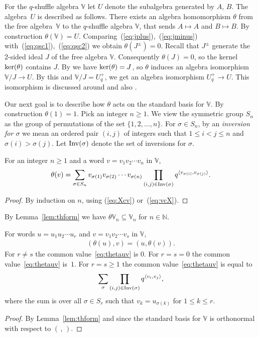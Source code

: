 For the $q$-shuffle algebra $\mathbb V$ let $U$ denote the
subalgebra generated by $A$, $B$. The algebra~$U$ is described as follows.
There exists an algebra homomorphism $\theta$ from
the free algebra~$\mathbb V$ to the $q$-shuffle algebra $\mathbb V$, that sends
$A\mapsto A$ and $B\mapsto B$. By construction $\theta(\mathbb V)=U$.
Comparing~(\ref{eq:jplus}),~(\ref{eq:jminus}) with~(\ref{eq:qsc1}),~(\ref{eq:qsc2})
 we obtain $\theta(J^\pm)=0$.
Recall that $J^\pm$ generate the 2-sided ideal $J$ of
the free algebra $\mathbb V$. Consequently $\theta (J)=0$,
so the kernel ${\rm ker}(\theta)$ contains $J$.
 By
\cite[Theorem~15]{rosso} we have
 ${\rm ker}(\theta)=J$,
so $\theta$ induces an algebra isomorphism $\mathbb V/J\to U$.
By this and $\mathbb V/J=U^+_q$, we get an algebra
isomorphism $U^+_q\to U$.
This isomorphism is discussed
around \cite[Theorem~15]{rosso} and also \cite[p.~696]{leclerc}.

Our next goal is to describe how $\theta$ acts on the
standard basis for $\mathbb V$.
By construction $\theta(1)=1$.
Pick an integer $n\geq 1$.
We view the symmetric group $S_n$
as the group of permutations of the set
$\lbrace 1,2,\ldots, n\rbrace$. For $\sigma \in S_n$, by an
{\it inversion
for $\sigma$} we mean an ordered pair $(i,j)$ of integers
such that $1 \leq i< j \leq n$ and $\sigma(i) > \sigma(j)$.
Let ${\rm Inv}(\sigma)$ denote the set of inversions for $\sigma$.

\begin{Lemma}\label{lem:thform}For an integer $n\geq 1$ and a word $v=v_1 v_2 \cdots v_n$ in $\mathbb V$,
\begin{gather*}%
\theta(v) =\sum_{\sigma \in S_n}v_{\sigma(1)}v_{\sigma(2)} \cdots v_{\sigma(n)} \prod_{(i,j)\in {\rm Inv}(\sigma)} q^{\langle v_{\sigma(i)}, v_{\sigma(j)}\rangle}.
\end{gather*}
\end{Lemma}
\begin{proof}By induction on $n$, using (\ref{eq:Xcv}) or~(\ref{eq:vcX}).
\end{proof}

By Lemma~\ref{lem:thform} we have $\theta \mathbb V_n \subseteq \mathbb V_n $ for $n \in \mathbb N$.

\begin{Lemma}\label{lem:uvtheta}For words $u=u_1u_2\cdots u_r$ and $v=v_1v_2\cdots v_s$ in $\mathbb V$,
\begin{gather}
(\theta(u),v)= (u, \theta(v)).\label{eq:thetauv}
\end{gather}
For $r\not=s$ the common value~\eqref{eq:thetauv} is $0$. For $r=s=0$ the common value~\eqref{eq:thetauv} is~$1$. For $r=s\geq 1$ the common value~\eqref{eq:thetauv}
is equal to
\begin{gather*}
 \sum_{\sigma}\prod_{(i,j)\in {\rm Inv}(\sigma)}q^{\langle v_i, v_j \rangle},
\end{gather*}
where the sum is over all $\sigma \in S_r$ such that $v_k = u_{\sigma(k)}$ for $1 \leq k \leq r$.
\end{Lemma}
\begin{proof} By Lemma~\ref{lem:thform} and since the standard basis for $\mathbb V$ is orthonormal with respect to $(\,,\,)$.
\end{proof}

